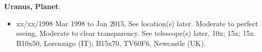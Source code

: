 {\bf Uranus, Planet}:
\begin{itemize}
\item xx/xx/1998 Mar 1998 to Jan 2015, See location(s) later. Moderate to perfect seeing, Moderate to clear transparency. See telescope(s) later, 10x; 15x; 15x. B10x50, Lorenzago (IT); B15x70, TV60F6, Newcastle (UK).
\end{itemize}
